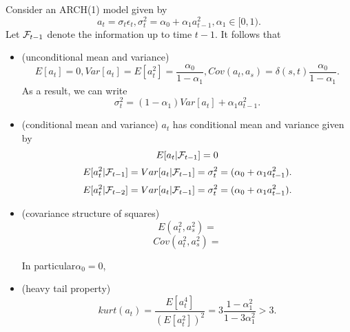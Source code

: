 \begin{theorem}\cite[118]{tsay2005analysis}\label{ch:time-series-analysis:th:BasicStatisticalProperitesARCH(1)}
	Consider an ARCH(1) model given by
	$$a_t = \sigma_t \epsilon_t, \sigma_t^2 = \alpha_0 + \alpha_1a_{t-1}^2, \alpha_1 \in [0,1).$$
Let $\mathcal{F}_{t-1}$ denote the information up to time $t-1$. It follows that
\begin{itemize}
	\item (unconditional mean and variance)
	$$E[a_t] = 0, Var[a_t] = E[a_t^2] = \frac{\alpha_0}{1-\alpha_1},Cov(a_t,a_s) = \delta(s,t) \frac{\alpha_0}{1 - \alpha_1}.$$
	As a result, we can write
	$$\sigma_t^2 = (1-\alpha_1)Var[a_t] + \alpha_1 a_{t-1}^2.$$
	\item (conditional mean and variance) $a_t$ has conditional mean and variance given by
	$$E[a_t|\mathcal{F}_{t-1}] = 0$$
	$$ E[a_t^2|\mathcal{F}_{t-1}]  = Var[a_t|\mathcal{F}_{t-1}] = \sigma_t^2 = (\alpha_0 + \alpha_1 a_{t-1}^2).$$
	$$ E[a_t^2|\mathcal{F}_{t-2}]  = Var[a_t|\mathcal{F}_{t-1}] = \sigma_t^2 = (\alpha_0 + \alpha_1 a_{t-1}^2).$$
	
	\item (covariance structure of squares)
	$$E(a_t^2,a_s^2) = $$
	$$Cov(a_t^2,a_s^2) = $$
	
	In particular$\alpha_0 = 0$, 
	\item (heavy tail property)
	$$kurt(a_t) = \frac{E[a_t^4]}{(E[a_t^2])^2} = 3\frac{1-\alpha_1^2}{1 - 3\alpha_1^2} > 3.$$
\end{itemize}
\end{theorem}
